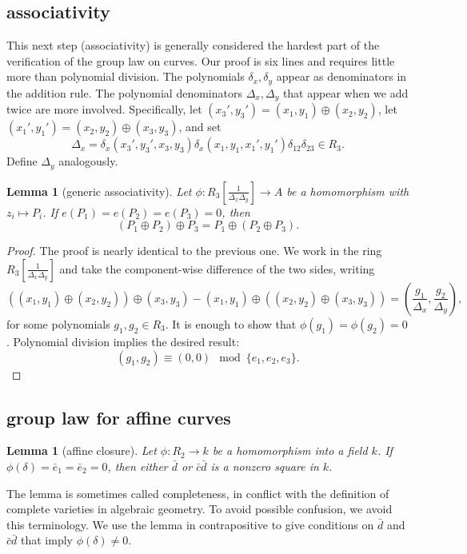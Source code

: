 \documentclass[12pt]{article}
\newtheorem{lemma}[theorem]{Lemma}
\newcommand{\f}[1]{\frac{1}{#1}}
\def\cong{\equiv}
\begin{document}
\subsection{associativity}

This next step (associativity) is generally considered the hardest
part of the verification of the group law on curves.  Our proof is six lines
and requires little more than polynomial division.  The polynomials
$\delta_x,\delta_y$ appear as denominators in the addition rule.  The
polynomial denominators $\Delta_x,\Delta_y$ that appear when we add twice are
more involved.  Specifically, let $ (x_3',y_3')=(x_1,y_1) \oplus
(x_2,y_2)$, let $(x_1',y_1')=(x_2,y_2) \oplus (x_3,y_3) $, and set
\[
\Delta_x = \delta_x(x_3',y_3',x_3,y_3)
\delta_x(x_1,y_1,x_1',y_1')\delta_{12}\delta_{23}\in R_3.
\]
Define $\Delta_y$ analogously.

\begin{lemma}[generic associativity] \label{lemma:assoc} Let
  $\phi:R_3[\f{\Delta_x\Delta_y}]\to A$ be a homomorphism with $z_i\mapsto P_i$.
  If $e(P_1)=e(P_2)=e(P_3)=0$, then
\[
(P_1 \oplus P_2)\oplus P_3 = 
P_1 \oplus (P_2\oplus P_3).
\]
\end{lemma}

\begin{proof} The proof is nearly identical to the previous one.  We
  work in the ring $R_3[\f{\Delta_x\Delta_y}]$ and take the
  component-wise difference of the two sides, writing
\[
((x_1,y_1)\oplus (x_2,y_2)) \oplus (x_3,y_3)-
(x_1,y_1)\oplus ((x_2,y_2) \oplus (x_3,y_3)) 
= (\frac{g_1}{\Delta_x},\frac{g_2}{\Delta_y}),
\]
for some polynomials $g_1,g_2 \in R_3$.  
It is enough to show that $\phi(g_1)=\phi(g_2)=0$. 
Polynomial division implies the desired result:
\[
(g_1,g_2)\cong (0,0) \mod \{e_1,e_2,e_3\}.
\]
\end{proof}

\subsection{group law for affine curves}

\begin{lemma}[affine closure] \label{lemma:affine} Let $\phi:R_2\to k$
  be a homomorphism into a field $k$.  If $\phi(\delta)=\bar e_1=\bar
  e_2=0$, then either $\bar d$ or $\bar c \bar d$ is a nonzero square
  in $k$.
\end{lemma}

The lemma is sometimes called completeness, in conflict with the
definition of complete varieties in algebraic geometry.  To avoid
possible confusion, we avoid this terminology.  We use the lemma in
contrapositive to give conditions on $\bar d$ and $\bar c\bar d$ that
imply $\phi(\delta)\ne0$.
\end{document}
